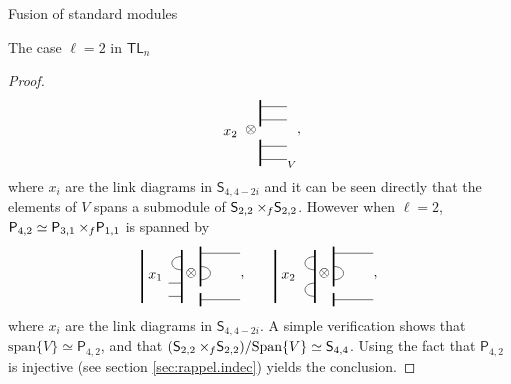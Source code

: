 \documentclass[reqno]{amsart}
\newcommand{\tl}[1]{\mathsf{TL}_{#1}}
\newcommand{\ds}[1]{\mathsf S_{#1}}
\newcommand{\dP}[1]{\mathsf P_{#1}}
\newcommand{\xf}{\times\hspace{-0.27em}_f}
\newcommand{\lc}{\ell}
\begin{document}
\begin{section}{Fusion of standard modules}
\begin{subsection}{The case $\lc =2$ in $\tl{n}$}
\begin{proof}
\begin{equation}
{\begin{tikzpicture}[baseline={(current bounding box.center)},scale = 1/3]
%
	\node at (1,0) {$x_2$};
\end{tikzpicture}\otimes \begin{tikzpicture}[baseline={(current bounding box.center)},scale = 1/3]
	\draw[very thick] (0,-5/2) -- (0,-1/2);
	\draw[very thick] (0,1/2) -- (0,5/2);
	\draw (0,-2) -- (2,-2);
	\draw (0,-1) -- (2,-1);
	\draw (0,1) -- (2,1);
	\draw (0,2) -- (2,2);
\end{tikzpicture}}_{V},
\end{equation}
where $x_{i}$ are the link diagrams in $\ds{4,4-2i}$ and it can be seen directly that the elements of $V$ spans a submodule of $\ds{2,2} \xf \ds{2,2} $. However when $\lc =2$, $\dP{4,2}\simeq\dP{3,1}\xf \dP{1,1} $ is spanned by
\begin{equation}
\begin{tikzpicture}[baseline={(current bounding box.center)},scale = 1/3]
%
	\draw[very thick] (0,-2) -- (0,2);
	\draw[very thick] (3,-2) -- (3,2);
	\node at (1,0) {$x_1$};
	\draw (2,-3/2) -- (3,-3/2);
	\draw (2,-1/2) -- (3,-1/2);
	\draw (3,1/2) .. controls (2,1/2) and (2,3/2) .. (3,3/2);
%
\end{tikzpicture} \otimes
\begin{tikzpicture}[baseline={(current bounding box.center)},scale = 1/3]
%
	\draw[very thick] (0,-1) -- (0,2);
	\draw (0,3/2) -- (3,3/2);
	\draw (0,-1/2) .. controls (1,-1/2) and (1,1/2) .. (0,1/2);
	\draw[very thick] (0,-5/2) -- (0,-3/2);
	\draw (0,-2) -- (3,-2);
%
\end{tikzpicture} , \qquad
\begin{tikzpicture}[baseline={(current bounding box.center)},scale = 1/3]
%
	\draw[very thick] (0,-2) -- (0,2);
	\draw[very thick] (3,-2) -- (3,2);
	\node at (1,0) {$x_2$};
	\draw (3,-3/2) ..controls (2,-3/2) and (2,-1/2) .. (3,-1/2);
	\draw (3,1/2) .. controls (2,1/2) and (2,3/2) .. (3,3/2);
%
\end{tikzpicture} \otimes
\begin{tikzpicture}[baseline={(current bounding box.center)},scale = 1/3]
%
	\draw[very thick] (0,-1) -- (0,2);
	\draw (0,3/2) -- (3,3/2);
	\draw (0,-1/2) .. controls (1,-1/2) and (1,1/2) .. (0,1/2);
	\draw[very thick] (0,-5/2) -- (0,-3/2);
	\draw (0,-2) -- (3,-2);
%
\end{tikzpicture}, 
\end{equation}
where  $x_{i}$ are the link diagrams in $\ds{4,4-2i}$. A simple verification shows that $\text{span}\{V\}\simeq \dP{4,2}$, and that $(\ds{2,2} \xf \ds{2,2})/\text{Span}\{V\} \simeq \ds{4,4}$. Using the fact that $\dP{4,2}$ is injective (see section \ref{sec:rappel.indec}) yields the conclusion.



\end{proof}
\end{subsection}
\end{section}
\end{document}
